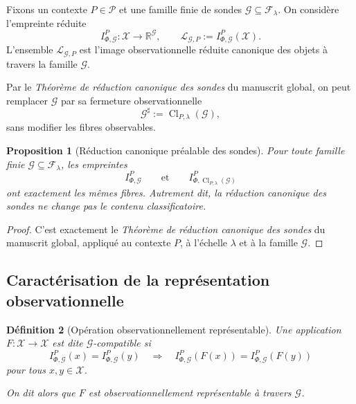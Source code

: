 \documentclass[11pt,a4paper,openany]{book}
\newtheorem{definition}{Définition}[chapter]
\newtheorem{proposition}[definition]{Proposition}
\begin{document}
Fixons un contexte \(P\in\mathcal P\) et une famille finie de sondes \(\mathcal G\subseteq\mathcal F_\lambda\). On considère l'empreinte réduite
\[
I_{\Phi,\mathcal G}^P:\mathcal X\longrightarrow \mathbb R^{\mathcal G},
\qquad
\mathcal L_{\mathcal G,P}:=I_{\Phi,\mathcal G}^P(\mathcal X).
\]
L'ensemble \(\mathcal L_{\mathcal G,P}\) est l'image observationnelle réduite canonique des objets à travers la famille \(\mathcal G\).

Par le \emph{Théorème de réduction canonique des sondes} du manuscrit global, on peut remplacer \(\mathcal G\) par sa fermeture observationnelle
\[
\mathcal G^\sharp:=\operatorname{Cl}_{P,\lambda}(\mathcal G),
\]
sans modifier les fibres observables.

\begin{proposition}[Réduction canonique préalable des sondes]
\label{prop:reduction-prealable}
Pour toute famille finie \(\mathcal G\subseteq\mathcal F_\lambda\), les empreintes
\[
I_{\Phi,\mathcal G}^P
\qquad\text{et}\qquad
I_{\Phi,\operatorname{Cl}_{P,\lambda}(\mathcal G)}^P
\]
ont exactement les mêmes fibres.
Autrement dit, la réduction canonique des sondes ne change pas le contenu classificatoire.
\end{proposition}

\begin{proof}
C'est exactement le \emph{Théorème de réduction canonique des sondes} du manuscrit global, appliqué au contexte \(P\), à l'échelle \(\lambda\) et à la famille \(\mathcal G\).
\end{proof}

\subsection{Caractérisation de la représentation observationnelle}

\begin{definition}[Opération observationnellement représentable]
Une application \(F:\mathcal X\to\mathcal X\) est dite \(\mathcal G\)-compatible si
\[
I_{\Phi,\mathcal G}^P(x)=I_{\Phi,\mathcal G}^P(y)
\quad\Longrightarrow\quad
I_{\Phi,\mathcal G}^P(F(x))=I_{\Phi,\mathcal G}^P(F(y))
\]
pour tous \(x,y\in\mathcal X\).

On dit alors que \(F\) est observationnellement représentable à travers \(\mathcal G\).
\end{definition}
\end{document}
